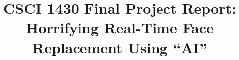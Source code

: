 
 \documentclass[10pt,twocolumn,letterpaper]{article}

\usepackage{cvpr}
\usepackage{times}
\usepackage{epsfig}
\usepackage{graphicx}
\usepackage{amsmath}
\usepackage{amssymb}
\usepackage{booktabs}
\usepackage{microtype}
\usepackage[numbered,framed]{matlab-prettifier}

\frenchspacing


\usepackage[pagebackref=true,breaklinks=true,letterpaper=true,colorlinks,bookmarks=false]{hyperref}

\cvprfinalcopy
\def\cvprPaperID{****}
\def\httilde{\mbox{\tt\raisebox{-.5ex}{\symbol{126}}}}
\ifcvprfinal\pagestyle{empty}\fi



\title{CSCI 1430 Final Project Report:\\Horrifying Real-Time Face Replacement Using ``AI''}

